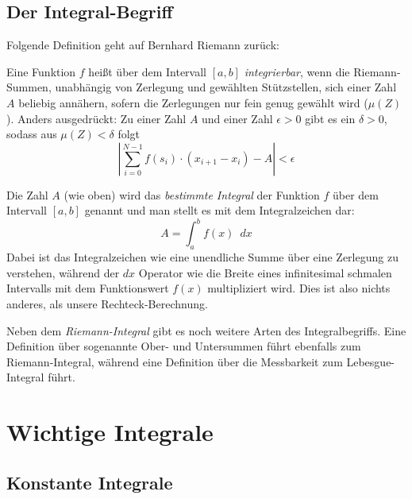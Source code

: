 \subsection{Der Integral-Begriff}

Folgende Definition geht auf Bernhard Riemann zurück:

\begin{definition}
Eine Funktion $f$ heißt über dem Intervall $[a,b]$ \emph{integrierbar}, wenn die Riemann-Summen, unabhängig von Zerlegung und gewählten Stützstellen, sich einer Zahl $A$ beliebig annähern, sofern die Zerlegungen nur fein genug gewählt wird ($\mu(Z)$). Anders ausgedrückt: Zu einer Zahl $A$ und einer Zahl $\epsilon >0$ gibt es ein $\delta >0$, sodass aus $\mu(Z)<\delta$ folgt
\begin{equation}
\left| \sum_{i=0}^{N-1} f(s_i)\cdot (x_{i+1}-x_i) -A \right| < \epsilon
\end{equation}
\end{definition}

\begin{definition}
Die Zahl $A$ (wie oben) wird das \emph{bestimmte Integral} der Funktion $f$ über dem Intervall $[a,b]$ genannt und man stellt es mit dem Integralzeichen dar:
\begin{equation}
A = \int_{a}^{b} f(x) \enspace dx
\end{equation}
Dabei ist das Integralzeichen wie eine unendliche Summe über eine Zerlegung zu verstehen, während der $dx$ Operator wie die Breite eines infinitesimal schmalen Intervalls mit dem Funktionswert $f(x)$ multipliziert wird. Dies ist also nichts anderes, als unsere Rechteck-Berechnung.
\end{definition}

Neben dem \emph{Riemann-Integral} gibt es noch weitere Arten des Integralbegriffs. Eine Definition über sogenannte Ober- und Untersummen führt ebenfalls zum Riemann-Integral, während eine Definition über die Messbarkeit zum Lebesgue-Integral führt.

\section{Wichtige Integrale}

\subsection{Konstante Integrale}

